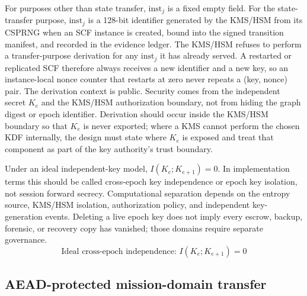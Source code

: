 \documentclass[11pt,letterpaper]{article}
\begin{document}
For purposes other than state transfer, $\mathrm{inst}_j$ is a fixed empty field. For the state-transfer purpose, $\mathrm{inst}_j$ is a 128-bit identifier generated by the KMS/HSM from its CSPRNG when an SCF instance is created, bound into the signed transition manifest, and recorded in the evidence ledger. The KMS/HSM refuses to perform a transfer-purpose derivation for any $\mathrm{inst}_j$ it has already served. A restarted or replicated SCF therefore always receives a new identifier and a new key, so an instance-local nonce counter that restarts at zero never repeats a (key, nonce) pair.
The derivation context is public. Security comes from the independent secret $K_e$ and the KMS/HSM authorization boundary, not from hiding the graph digest or epoch identifier. Derivation should occur inside the KMS/HSM boundary so that $K_e$ is never exported; where a KMS cannot perform the chosen KDF internally, the design must state where $K_e$ is exposed and treat that component as part of the key authority's trust boundary.

Under an ideal independent-key model, $I(K_e;K_{e+1})=0$. In implementation terms this should be called cross-epoch key independence or epoch key isolation, not session forward secrecy. Computational separation depends on the entropy source, KMS/HSM isolation, authorization policy, and independent key-generation events. Deleting a live epoch key does not imply every escrow, backup, forensic, or recovery copy has vanished; those domains require separate governance.
\begin{equation}
\text{Ideal cross-epoch independence: } I(K_e;K_{e+1})=0
\end{equation}

\subsection{AEAD-protected mission-domain transfer}
\end{document}
